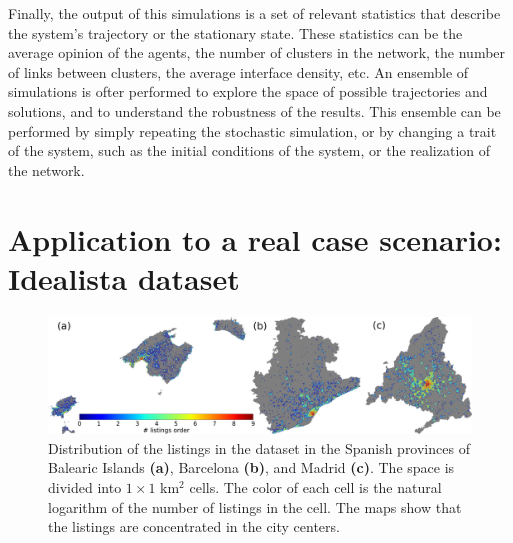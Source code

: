 Finally, the output of this simulations is a set of relevant statistics that describe the system's trajectory or the stationary state. These statistics can be the average opinion of the agents, the number of clusters in the network, the number of links between clusters, the average interface density, etc. An ensemble of simulations is ofter performed to explore the space of possible trajectories and solutions, and to understand the robustness of the results. This ensemble can be performed by simply repeating the stochastic simulation, or by changing a trait of the system, such as the initial conditions of the system, or the realization of the network.

\section{\label{sec:Datasets} Application to a real case scenario: Idealista dataset}

\begin{figure}
    \centering
    \captionsetup{font=sf}
    \includegraphics[width=\textwidth]{Figs/Introduction/adds_size_map.pdf}
    \caption[Listings distribution in space]{Distribution of the listings in the dataset in the Spanish provinces of Balearic Islands \textbf{(a)}, Barcelona \textbf{(b)}, and Madrid \textbf{(c)}. The space is divided into $1 \times 1$ km$^2$ cells. The color of each cell is the natural logarithm of the number of listings in the cell. The maps show that the listings are concentrated in the city centers. }
    \label{fig:maps_adds}
\end{figure}

